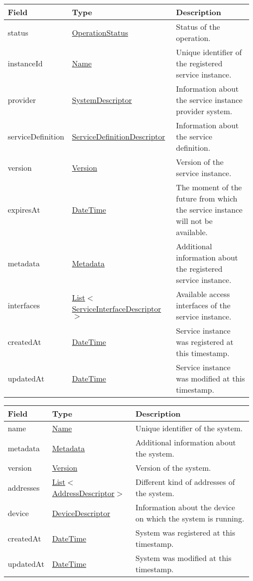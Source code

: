 \documentclass[a4paper]{arrowhead}
\newcommand{\pref}[1]{{\textcolor{ArrowheadGrey}{\hyperref[sec:model:primitives:#1]{#1}}}}
\begin{document}
\begin{table}[ht!]
\begin{tabularx}{\textwidth}{| p{2.6cm} | p{5.2cm} | X |} \hline
\rowcolor{gray!33} Field & Type      & Description \\ \hline
status & \pref{OperationStatus} & Status of the operation. \\ \hline
instanceId & \pref{Name} & Unique identifier of the registered service instance. \\ \hline
provider & \hyperref[sec:model:SystemDescriptor]{SystemDescriptor} & Information about the service instance provider system. \\ \hline
serviceDefinition & \hyperref[sec:model:ServiceDefinitionDescriptor]{ServiceDefinitionDescriptor} & Information about the service definition. \\ \hline
version & \pref{Version} & Version of the service instance. \\ \hline
expiresAt & \pref{DateTime} & The moment of the future from which the service ins\-tance will not be available. \\ \hline
metadata & \hyperref[sec:model:Metadata]{Metadata} & Additional information about the registered service ins\-tance. \\ \hline
interfaces & \pref{List}$<$\hyperref[sec:model:ServiceInterfaceDescriptor]{ServiceInterfaceDescriptor}$>$ & Available access interfaces of the service instance. \\ \hline
createdAt & \pref{DateTime} & Service instance was registered at this timestamp. \\ \hline
updatedAt & \pref{DateTime} & Service instance was modified at this timestamp. \\ \hline
\end{tabularx}
\end{table}

 
\begin{table}[ht!]
\begin{tabularx}{\textwidth}{| p{2.5cm} | p{4cm} | X |} \hline
\rowcolor{gray!33} Field & Type      & Description \\ \hline
name & \pref{Name} & Unique identifier of the system. \\ \hline
metadata & \hyperref[sec:model:Metadata]{Metadata} & Additional information about the system. \\ \hline
version & \pref{Version} & Version of the system. \\ \hline
addresses &  \pref{List}$<$\hyperref[sec:model:AddressDescriptor]{AddressDescriptor}$>$ & Different kind of addresses of the system.  \\ \hline
device & \hyperref[sec:model:DeviceDescriptor]{DeviceDescriptor} & Information about the device on which the system is running. \\ \hline
createdAt & \pref{DateTime} & System was registered at this timestamp. \\ \hline
updatedAt & \pref{DateTime} & System was modified at this timestamp. \\ \hline
\end{tabularx}
\end{table}
\end{document}
